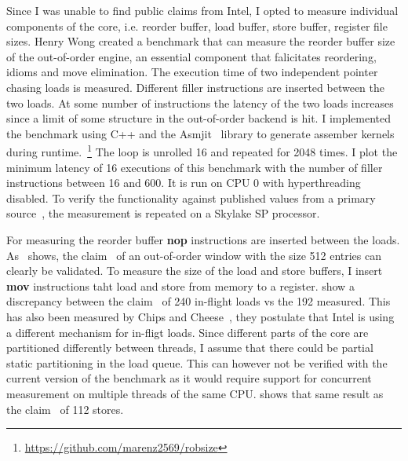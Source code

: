 Since I was unable to find public claims from Intel, I opted to measure individual components of the core, i.e. reorder buffer, load buffer, store buffer, register file sizes.
Henry Wong created a benchmark that can measure the reorder buffer size~\cite{Wong_2013_robsize} of the out-of-order engine, an essential component that falicitates reordering, idioms and move elimination.
The execution time of two independent pointer chasing loads is measured.
Different filler instructions are inserted between the two loads.
At some number of instructions the latency of the two loads increases since a limit of some structure in the out-of-order backend is hit.
I implemented the benchmark using C++ and the Asmjit~\cite{Kobalicek_AsmJit} library to generate assember kernels during runtime.~\footnote{\url{https://github.com/marenz2569/robsize}}
The loop is unrolled \SI{16}{} and repeated for \SI{2048}{} times.
I plot the minimum latency of \SI{16}{} executions of this benchmark with the number of filler instructions between \SI{16}{} and \SI{600}{}.
It is run on CPU 0 with hyperthreading disabled.
To verify the functionality against published values from a primary source~\cite{Intel_2020_Skylake_SP}, the measurement is repeated on a Skylake SP processor.

For measuring the reorder buffer \textbf{nop} instructions are inserted between the loads.
As~ shows, the claim~\cite{ServerTheHome_2023_SPR_Press,Wccftech_2023_SPR_Press} of an out-of-order window with the size \SI{512}{} entries can clearly be validated.
To measure the size of the load and store buffers, I insert \textbf{mov} instructions taht load and store from memory to a register.
 show a discrepancy between the claim~\cite{ServerTheHome_2023_SPR_Press,Wccftech_2023_SPR_Press} of 240 in-flight loads vs the 192 measured.
This has also been measured by Chips and Cheese~\cite{Chipsandcheese_2023_GoldenCove_Vector_Register}, they postulate that Intel is using a different mechanism for in-fligt loads.
Since different parts of the core are partitioned differently between threads, I assume that there could be partial static partitioning in the load queue.
This can however not be verified with the current version of the benchmark as it would require support for concurrent measurement on multiple threads of the same CPU.
 shows that same result as the claim~\cite{ServerTheHome_2023_SPR_Press,Wccftech_2023_SPR_Press} of 112 stores.

